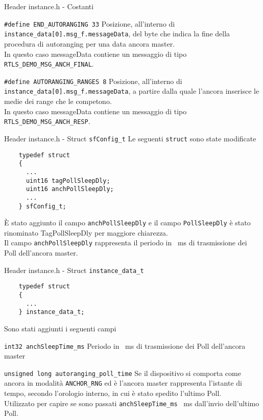 \begin{frame}[fragile]{Header instance.h - Costanti}
  \begin{block}{\lstinline!#define END_AUTORANGING 33!}
    Posizione, all'interno di \lstinline!instance_data[0].msg_f.messageData!, del byte
    che indica la fine della procedura di autoranging per una data ancora master.\\
    In questo caso messageData contiene un messaggio di tipo \lstinline!RTLS_DEMO_MSG_ANCH_FINAL!.
  \end{block}
  \begin{block}{\lstinline!#define AUTORANGING_RANGES 8!}
    Posizione, all'interno di \lstinline!instance_data[0].msg_f.messageData!, a partire dalla quale
    l'ancora inserisce le medie dei range che le competono.\\
    In questo caso messageData contiene un messaggio di tipo \lstinline!RTLS_DEMO_MSG_ANCH_RESP!.
  \end{block}
\end{frame}

\begin{frame}[fragile]{Header instance.h - Struct \lstinline!sfConfig_t!}
  Le seguenti \lstinline!struct! sono state modificate
  \begin{lstlisting}
    typedef struct
    {
      ...
      uint16 tagPollSleepDly;
      uint16 anchPollSleepDly;
      ...
    } sfConfig_t;
  \end{lstlisting}
  È stato aggiunto il campo \lstinline!anchPollSleepDly! e il campo \lstinline!PollSleepDly! è stato rinominato
  TagPollSleepDly per maggiore chiarezza.\\
  Il campo \lstinline!anchPollSleepDly! rappresenta il periodo in \SI{}{\milli\second} di trasmissione dei Poll
  dell'ancora master.

\end{frame}

\begin{frame}[fragile]{Header instance.h - Struct \lstinline!instance_data_t!}
  \begin{lstlisting}
    typedef struct
    {
      ...
    } instance_data_t;
  \end{lstlisting}
  Sono stati aggiunti i seguenti campi
  \begin{block}{\lstinline!int32 anchSleepTime_ms!}
    Periodo in \SI{}{\milli\second} di trasmissione dei Poll dell'ancora master
  \end{block}
  
  \begin{block}{\lstinline!unsigned long autoranging_poll_time!}
    Se il dispositivo si comporta come ancora in modalità \lstinline!ANCHOR_RNG! ed è l'ancora master
    rappresenta l'istante di tempo, secondo l'orologio interno, in cui è stato spedito l'ultimo Poll.\\
    Utilizzato per capire se sono passati \lstinline!anchSleepTime_ms! \SI{}{\milli\second} dall'invio dell'ultimo Poll.\\
  \end{block}
\end{frame}

